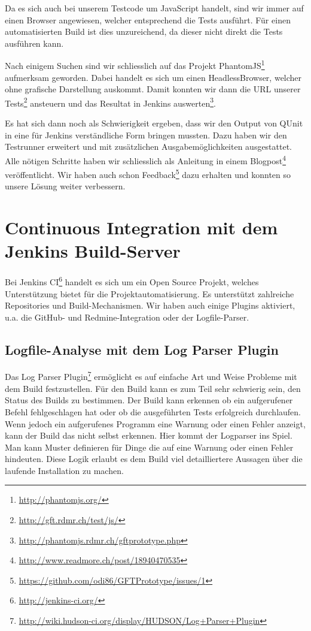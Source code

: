Da es sich auch bei unserem Testcode um JavaScript handelt, sind wir immer auf einen Browser angewiesen, welcher entsprechend die Tests ausführt. Für einen automatisierten Build ist dies unzureichend, da dieser nicht direkt die Tests ausführen kann.

Nach einigem Suchen sind wir schliesslich auf das Projekt PhantomJS\footnote{\url{http://phantomjs.org/}} aufmerksam geworden. Dabei handelt es sich um einen \gls{HeadlessBrowser}, welcher ohne grafische Darstellung auskommt. Damit konnten wir dann die URL unserer Tests\footnote{\url{http://gft.rdmr.ch/test/js/}} ansteuern und das Resultat in Jenkins auswerten\footnote{\url{http://phantomjs.rdmr.ch/gftprototype.php}}.

Es hat sich dann noch als Schwierigkeit ergeben, dass wir den Output von QUnit in eine für Jenkins verständliche Form bringen mussten. Dazu haben wir den Testrunner  erweitert und mit zusätzlichen Ausgabemöglichkeiten ausgestattet. Alle nötigen Schritte haben wir schliesslich als Anleitung in einem Blogpost\footnote{\url{http://www.readmore.ch/post/18940470535}} veröffentlicht. Wir haben auch schon Feedback\footnote{\url{https://github.com/odi86/GFTPrototype/issues/1}} dazu erhalten und konnten so unsere Lösung weiter verbessern.

\section{Continuous Integration mit dem Jenkins Build-Server}
Bei Jenkins CI\footnote{\url{http://jenkins-ci.org/}} handelt es sich um ein Open Source Projekt, welches Unterstützung bietet für die Projektautomatisierung. Es unterstützt zahlreiche Repositories und Build-Mechanismen. Wir haben auch einige Plugins aktiviert, u.a. die GitHub- und Redmine-Integration oder der Logfile-Parser.

\subsection{Logfile-Analyse mit dem Log Parser Plugin}
Das Log Parser Plugin\footnote{\url{http://wiki.hudson-ci.org/display/HUDSON/Log+Parser+Plugin}} ermöglicht es auf einfache Art und Weise Probleme mit dem Build festzustellen. Für den Build kann es zum Teil sehr schwierig sein, den Status des Builds zu bestimmen. Der Build kann erkennen ob ein aufgerufener Befehl fehlgeschlagen hat oder ob die ausgeführten Tests erfolgreich durchlaufen. Wenn jedoch ein aufgerufenes Programm eine Warnung oder einen Fehler anzeigt, kann der Build das nicht selbst erkennen. Hier kommt der Logparser ins Spiel. Man kann Muster definieren für Dinge die auf eine Warnung oder einen Fehler hindeuten. Diese Logik erlaubt es dem Build viel detailliertere Aussagen über die laufende Installation zu machen.

